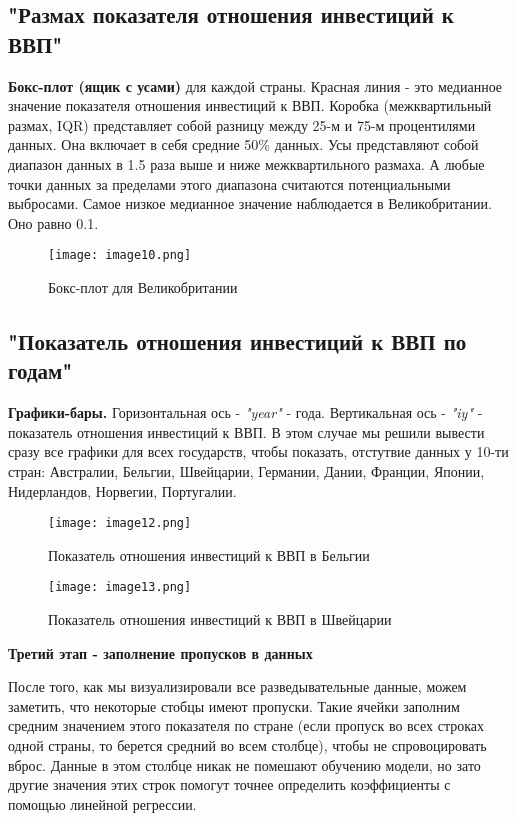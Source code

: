 \documentclass[12pt]{article}
\begin{document}
\subsection{"Размах показателя отношения инвестиций к ВВП"{}}
 
 \textbf{Бокс-плот (ящик с усами)} для каждой страны. Красная линия - это медианное значение показателя отношения инвестиций к ВВП. Коробка (межквартильный размах, IQR) представляет собой разницу между 25-м и 75-м процентилями данных. Она включает в себя средние 50\% данных. Усы представляют собой диапазон данных в 1.5 раза выше и ниже межквартильного размаха. А любые точки данных за пределами этого диапазона считаются потенциальными выбросами. Самое низкое медианное значение наблюдается в Великобритании. Оно равно 0.1.
 
\newpage
\begin{figure}[h]
    \centering
    \texttt{[image: image10.png]} 
    \caption{Бокс-плот для Великобритании}
    \label{fig:img1}
  \end{figure}

\subsection{"Показатель отношения инвестиций к ВВП по годам"{}}

\textbf{Графики-бары.} Горизонтальная ось - \textit{"year"{}} - года. Вертикальная ось - \textit{"iy"{}} - показатель отношения инвестиций к ВВП. В этом случае мы решили вывести сразу все графики для всех государств, чтобы показать, отстутвие данных у 10-ти стран: Австралии, Бельгии, Швейцарии, Германии, Дании, Франции, Японии, Нидерландов, Норвегии, Португалии.

\begin{figure}[!htp]
    \centering
    \texttt{[image: image12.png]} 
    \caption{Показатель отношения инвестиций к ВВП в Бельгии}
    \label{fig:img1}
  \end{figure}

\begin{figure}[!htp]
    \centering
    \texttt{[image: image13.png]} 
    \caption{Показатель отношения инвестиций к ВВП в Швейцарии}
    \label{fig:img1}
  \end{figure}
  
\newpage

\textbf{Третий этап - заполнение пропусков в данных}
\par После того, как мы визуализировали все разведывательные данные, можем заметить, что некоторые стобцы имеют пропуски. Такие ячейки заполним средним значением этого показателя по стране (если пропуск во всех строках одной страны, то берется средний во всем столбце), чтобы не спровоцировать вброс. Данные в этом столбце никак не помешают обучению модели, но зато другие значения этих строк помогут точнее определить коэффициенты с помощью линейной регрессии.
\end{document}
